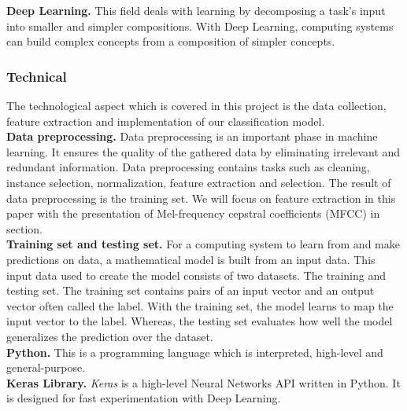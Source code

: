 \textbf{Deep Learning.} This field deals with learning by decomposing a task's
input into smaller and simpler compositions. With Deep Learning, computing
systems can build complex concepts from a composition of simpler concepts.

\subsubsection{Technical} The technological aspect which is covered in this
project is the data collection, feature extraction and implementation of our
classification model. \\

\textbf{Data preprocessing.} Data preprocessing is an important phase in machine
learning. It ensures the quality of the gathered data by eliminating irrelevant
and redundant information. Data preprocessing contains tasks such as cleaning,
instance selection, normalization, feature extraction and selection. The result
of data preprocessing is the training set. We will focus on feature extraction
in this paper with the presentation of Mel-frequency cepstral coefficients
(MFCC) in section.\\


\textbf{Training set and testing set.} For a computing system to learn
from and make predictions on data, a mathematical model is built from an input
data. This input data used to create the model consists of two datasets. The
training and testing set. The training set contains pairs of an input vector and
an output vector often called the label. With the training set, the model learns
to map the input vector to the label. Whereas, the testing set evaluates how
well the model generalizes the prediction over the dataset.\\

\textbf{Python.} This is a programming language which is interpreted, high-level
and general-purpose.~\cite{Python}\\

\textbf{Keras Library.} \textit{Keras} is a high-level Neural Networks API
written in Python. It is designed for fast experimentation with Deep
Learning.~\cite{chollet2015keras}
